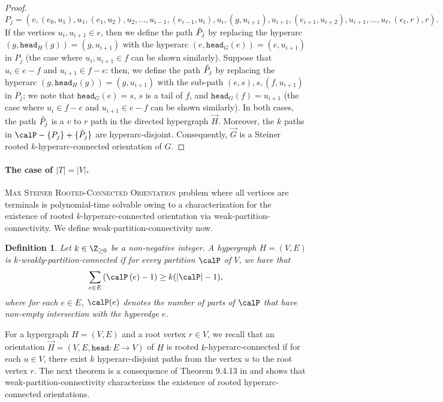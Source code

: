 \documentclass{article}
\newtheorem{definition}{Definition}[section]
\newcommand{\knote}[1]{{\color{red}[{\tiny Karthik: \bf #1}]\marginpar{\color{red}*}}}
\newcommand{\head}{\ensuremath{\texttt{head}}\xspace}
\begin{document}
\begin{proof}
        $$P_j = \left(v, \left(e_0, u_1\right), u_1, \left(e_1, u_2\right), u_2,  \ldots, u_{i-1}, \left(e_{i-1}, u_{i}\right), u_i, \left(g, u_{i+1}\right), u_{i+1}, \left(e_{i+1}, u_{i+2}\right), u_{i+1}, \ldots, u_{\ell}, \left(e_\ell, r\right), r\right).$$ 
        If the vertices $u_i, u_{i+1} \in e$, then we define the path $\Tilde{P}_j$ by replacing the hyperarc $(g, \head_H(g))=(g, u_{i+1})$ with the hyperarc $(e, \head_G(e))=(e, u_{i+1})$ in $P_j$ (the case where $u_i, u_{i+1} \in f$ can be shown similarly). 
        Suppose that $u_i \in e-f$ and $u_{i+1} \in f-e$: then, we define the path $\Tilde{P}_j$ by replacing the hyperarc $(g, \head_H(g))=(g,u_{i+1})$ with 
        the sub-path $(e, s), s, (f, u_{i+1})$ in $P_j$; we note that $\head_G(e)=s$, $s$ is a tail of $f$, and $\head_G(f)=u_{i+1}$ (the case where $u_i \in f-e$ and $u_{i+1} \in e-f$ can be shown similarly). 
        In both cases, the path $\Tilde{P}_j$ is a $v$ to $r$ path in the directed hypergraph $\overrightarrow{H}$. Moreover, the $k$ paths in $\calP - \{P_j\} + \{\Tilde{P}_j\}$ are hyperarc-disjoint. Consequently, $\overrightarrow{G}$ is a Steiner rooted $k$-hyperarc-connected orientation of $G$.
\end{proof}

\paragraph{The case of $|T|=|V|$. } \textsc{Max Steiner Rooted-Connected Orientation} problem where all vertices are terminals is polynomial-time solvable owing to a characterization for the existence of rooted $k$-hyperarc-connected orientation via weak-partition-connectivity. We define weak-partition-connectivity now. 
\begin{definition}\label{defn:weak-partition-connectivity}
    Let $k \in \Z_{\geq 0}$ be a non-negative integer. A hypergraph $H = (V, E)$ is \emph{$k$-weakly-partition-connected} if for every partition $\calP$ of $V$, we have that $$\sum_{e \in E} \left(\calP\left(e\right) - 1\right) \geq k (|\calP| - 1),$$
    where for each $e \in E$, $\calP(e)$ denotes the number of parts of $\calP$ that have non-empty intersection with the hyperedge $e$. 
\end{definition}

For a hypergraph $H=(V, E)$ and a root vertex $r\in V$, we recall that an orientation $\overrightarrow{H}=(V, E, \head: E\rightarrow V)$ of $H$ is rooted $k$-hyperarc-connected if for each $u\in V$, there exist $k$ hyperarc-disjoint paths 
from the vertex $u$ to the root vertex $r$. 
The next theorem is a consequence of Theorem 9.4.13 in \cite{Frank-book} and shows that weak-partition-connectivity characterizes the existence of rooted hyperarc-connected orientations. 
\end{document}
